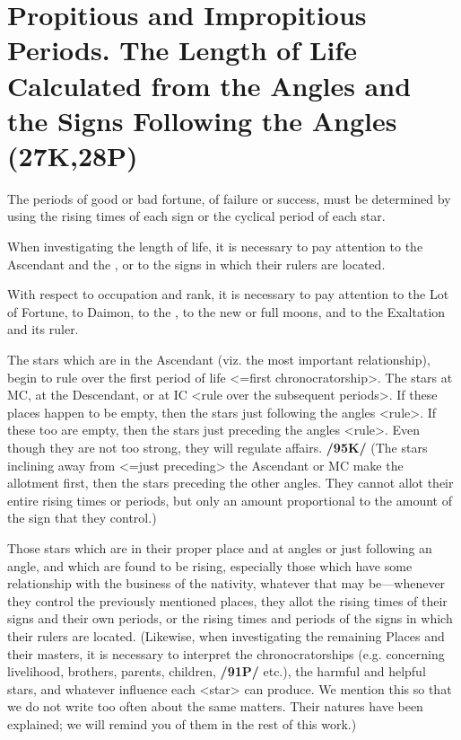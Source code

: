 \section{Propitious and Impropitious Periods. The Length of Life Calculated from the Angles and the Signs Following the Angles (27K,28P)}

The periods of good or bad fortune, of failure or success, must be determined by using the rising times of each sign or the cyclical period of each star. 

When investigating the length of life, it is necessary to pay attention to the Ascendant and the \Moon, or to the signs in which their rulers are located. 

With respect to occupation and rank, it is necessary to pay attention to the Lot of Fortune, to Daimon, to the \Sun, to the
new or full moons, and to the Exaltation and its ruler. 

The stars which are in the Ascendant (viz. the most important relationship), begin to rule over the first period of life <=first chronocratorship>. The stars at MC, at the Descendant, or at IC <rule over the subsequent periods>. If these places happen to be empty, then the stars just following the angles <rule>. If these too are empty, then the stars just preceding the angles <rule>. Even though they are not too strong, they will regulate affairs. \textbf{/95K/} (The stars inclining away from <=just preceding> the Ascendant or MC make the allotment first, then the stars preceding the
other angles. They cannot allot their entire rising times or periods, but only an amount proportional to the amount of the sign that they control.) 

Those stars which are in their proper place and at angles or just following an angle, and which are found to be rising, especially those which have some relationship with the business of the nativity, whatever that may be—whenever they control the previously mentioned places, they allot the rising times of their signs and their own periods, or the rising times and periods of the signs in which their rulers are located. \mndl (Likewise, when investigating the remaining Places and their masters, it is necessary to interpret the chronocratorships (e.g. concerning livelihood, brothers, parents, children, \textbf{/91P/} etc.), the harmful and helpful stars, and whatever influence each <star> can produce. We mention this so that we do not write too often about the same matters. Their natures have been explained; we will remind you of them in the rest of this work.)

